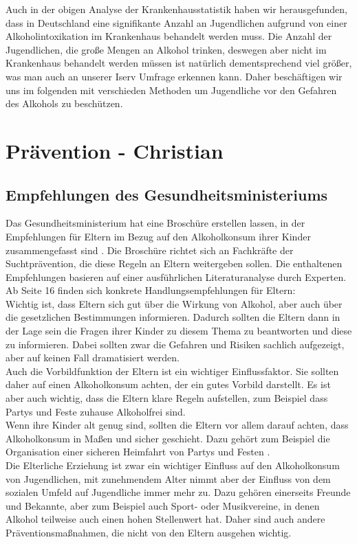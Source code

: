 \documentclass[12pt]{article}
\begin{document}
Auch in der obigen Analyse der Krankenhausstatistik haben wir herausgefunden, dass in Deutschland eine signifikante Anzahl an Jugendlichen aufgrund von einer Alkoholintoxikation im Krankenhaus behandelt werden muss. Die Anzahl der Jugendlichen, die große Mengen an Alkohol trinken, deswegen aber nicht im Krankenhaus behandelt werden müssen ist natürlich dementsprechend viel größer, was man auch an unserer Iserv Umfrage erkennen kann. %
Daher beschäftigen wir uns im folgenden mit verschieden Methoden um Jugendliche vor den Gefahren des Alkohols zu beschützen. 


\section{Prävention \footnotesize{- Christian}}

\subsection{Empfehlungen des Gesundheitsministeriums}
Das Gesundheitsministerium hat eine Broschüre erstellen lassen, in der Empfehlungen für Eltern im Bezug auf den Alkoholkonsum ihrer Kinder zusammengefasst sind \autocite{kuhn_empfehlungen_nodate}. Die Broschüre richtet sich an Fachkräfte der Suchtprävention, die diese Regeln an Eltern weitergeben sollen. Die enthaltenen Empfehlungen basieren auf einer ausführlichen Literaturanalyse durch Experten. Ab Seite 16 finden sich konkrete Handlungsempfehlungen für Eltern:\\
Wichtig ist, dass Eltern sich gut über die Wirkung von Alkohol, aber auch über die gesetzlichen Bestimmungen informieren. Dadurch sollten die Eltern dann in der Lage sein die Fragen ihrer Kinder zu diesem Thema zu beantworten und diese zu informieren. Dabei sollten zwar die Gefahren und Risiken sachlich aufgezeigt, aber auf keinen Fall dramatisiert werden.\\
Auch die Vorbildfunktion der Eltern ist ein wichtiger Einflussfaktor. Sie sollten daher auf einen Alkoholkonsum achten, der ein gutes Vorbild darstellt. Es ist aber auch wichtig, dass die Eltern klare Regeln aufstellen, zum Beispiel dass Partys und Feste zuhause Alkoholfrei sind.\\
Wenn ihre Kinder alt genug sind, sollten die Eltern vor allem darauf achten, dass Alkoholkonsum in Maßen und sicher geschieht. Dazu gehört zum Beispiel die Organisation einer sicheren Heimfahrt von Partys und Festen \autocite[16-23]{kuhn_empfehlungen_nodate}.\\
Die Elterliche Erziehung ist zwar ein wichtiger Einfluss auf den Alkoholkonsum von Jugendlichen, mit zunehmendem Alter nimmt aber der Einfluss von dem sozialen Umfeld auf Jugendliche immer mehr zu. Dazu gehören einerseits Freunde und Bekannte, aber zum Beispiel auch Sport- oder Musikvereine, in denen Alkohol teilweise auch einen hohen Stellenwert hat. Daher sind auch andere Präventionsmaßnahmen, die nicht von den Eltern ausgehen wichtig.
\end{document}
